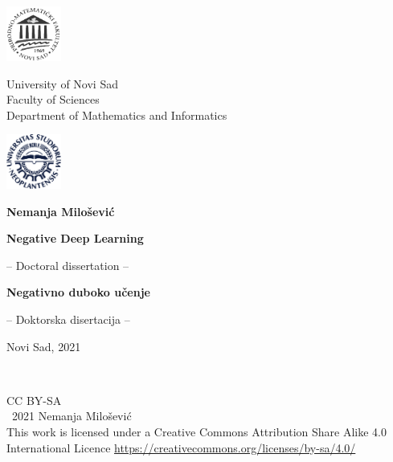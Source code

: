 \documentclass[b5paper]{book}
\author{\autor}
\title{\naslov}
\date{Novi Sad, 2021}
\newcommand{\naslov}{Negative Deep Learning}
\newcommand{\naslovsr}{Negativno duboko učenje}
\begin{document}
\frontmatter

\newcommand{\makemytitle}{
  \begin{center}

	\includegraphics[width=1.8cm]{pmf-logo}\hspace{\stretch{1}}
	\parbox[b]{45ex}{\centering
          University of Novi Sad\\
Faculty of Sciences\\
Department of Mathematics and Informatics\\ }\hspace{\stretch{1}}
	\includegraphics[width=1.8cm]{uns-logo}

	\vspace{15ex}

	\parbox[b]{\textwidth}{{\Large {\bf \hspace{0.5cm}Nemanja Milošević}}}
	\vspace{4ex}

	{\huge
            \setlength{\baselineskip}{1.5\baselineskip}\textbf{\naslov}\par}

	\vspace{4ex}
	-- Doctoral dissertation  --

        \vspace{5ex}

	{\huge
            \setlength{\baselineskip}{1.5\baselineskip}\textbf{\naslovsr}\par}

	\vspace{4ex}
	-- Doktorska disertacija  --

	\vfill

	Novi Sad, 2021
	\end{center}
	\thispagestyle{empty}
	\newpage
}

\makemytitle

~

\vfill

\thispagestyle{empty}
\noindent CC BY-SA \ccbysa\\
\textcopyright \ 2021 Nemanja Milošević\\
This work is licensed under a
Creative Commons Attribution Share Alike 4.0 International Licence
\url{https://creativecommons.org/licenses/by-sa/4.0/}
\end{document}
